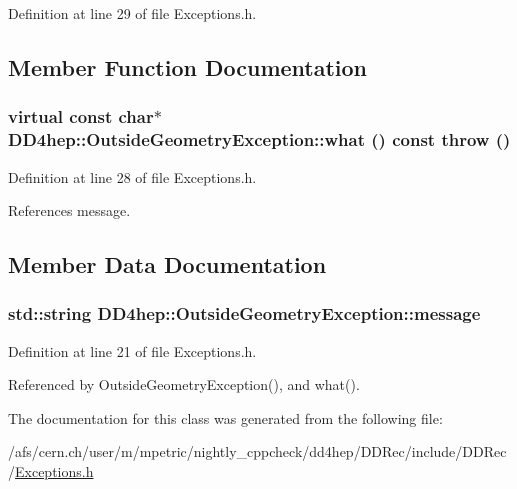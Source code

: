 Definition at line 29 of file Exceptions.h.

\subsection{Member Function Documentation}
\hypertarget{class_d_d4hep_1_1_outside_geometry_exception_a4105c314a245db5f8ee7347dbcb4c27f}{
\subsubsection[{what}]{\setlength{\rightskip}{0pt plus 5cm}virtual const char$\ast$ DD4hep::OutsideGeometryException::what () const  throw ()}}
\label{class_d_d4hep_1_1_outside_geometry_exception_a4105c314a245db5f8ee7347dbcb4c27f}


Definition at line 28 of file Exceptions.h.

References message.

\subsection{Member Data Documentation}
\hypertarget{class_d_d4hep_1_1_outside_geometry_exception_aaa768606a23c1acf432ffe83a76f0991}{
\subsubsection[{message}]{\setlength{\rightskip}{0pt plus 5cm}std::string {\bf DD4hep::OutsideGeometryException::message}}}
\label{class_d_d4hep_1_1_outside_geometry_exception_aaa768606a23c1acf432ffe83a76f0991}


Definition at line 21 of file Exceptions.h.

Referenced by OutsideGeometryException(), and what().

The documentation for this class was generated from the following file:\begin{DoxyCompactItemize}
\item 
/afs/cern.ch/user/m/mpetric/nightly\_\-cppcheck/dd4hep/DDRec/include/DDRec/\hyperlink{_d_d_rec_2include_2_d_d_rec_2_exceptions_8h}{Exceptions.h}\end{DoxyCompactItemize}
